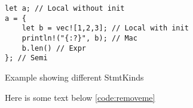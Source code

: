 \begin{code}
    \caption{}
\end{code}

\begin{code}
    \caption{}
\end{code}

\begin{code}
    \caption{}
\end{code}

\begin{code}
    \caption{}
\end{code}


\begin{code}
\begin{verbatim}
let a; // Local without init
a = {
    let b = vec![1,2,3]; // Local with init
    println!("{:?}", b); // Mac
    b.len() // Expr
}; // Semi
\end{verbatim}
\caption{Example showing different StmtKinds}
\end{code}


\begin{code}
    \caption{}
\end{code}

\begin{code}
    \caption{}
\end{code}

Here is some text below \autoref{code:removeme}
